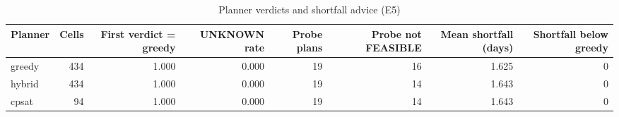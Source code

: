 \begin{table}[htbp]
\centering\small
\caption{Planner verdicts and shortfall advice (E5)}
\label{tab:t12}
\begin{tabular}{lrrrrrrr}
\toprule
Planner & Cells & First verdict = greedy & UNKNOWN rate & Probe plans & Probe not FEASIBLE & Mean shortfall (days) & Shortfall below greedy \\
\midrule
greedy & 434 & 1.000 & 0.000 & 19 & 16 & 1.625 & 0 \\
hybrid & 434 & 1.000 & 0.000 & 19 & 14 & 1.643 & 0 \\
cpsat & 94 & 1.000 & 0.000 & 19 & 14 & 1.643 & 0 \\
\bottomrule
\end{tabular}
\end{table}
